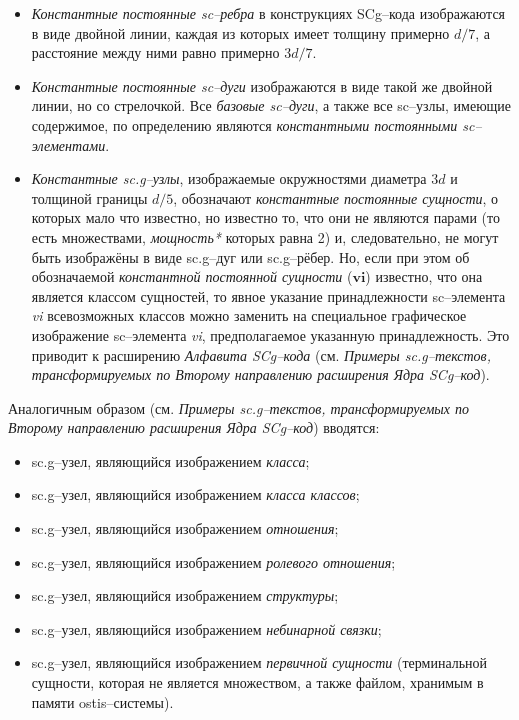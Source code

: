 \begin{itemize}
	\item \textit{Константные постоянные sc--ребра} в конструкциях SCg--кода изображаются в виде двойной линии, каждая из которых имеет толщину примерно $d/7$, а расстояние между ними равно примерно $3d/7$. 
	\item \textit{Константные постоянные sc--дуги} изображаются в виде такой же двойной линии, но со стрелочкой. Все \textit{базовые sc--дуги}, а также все sc--узлы, имеющие содержимое, по определению являются \textit{константными постоянными sc--элементами}. 
	\item \textit{Константные sc.g--узлы}, изображаемые окружностями диаметра $3d$ и толщиной границы $d/5$, обозначают \textit{константные постоянные сущности}, о которых мало что известно, но известно то, что они не являются парами (то есть множествами, \textit{мощность*} которых равна 2) и, следовательно, не могут быть изображёны в виде sc.g--дуг или sc.g--рёбер. Но, если при этом об обозначаемой \textit{константной постоянной сущности} ($\bm{vi}$) известно, что она является классом сущностей, то явное указание принадлежности sc--элемента \textit{vi} всевозможных классов можно заменить на специальное графическое изображение sc--элемента \textit{vi}, предполагаемое указанную принадлежность. Это приводит к расширению  \textit{Алфавита SCg--кода} (см. \textit{Примеры sc.g--текстов, трансформируемых по Второму направлению расширения Ядра SCg--код}).
\end{itemize}


Аналогичным образом (см. \textit{Примеры sc.g--текстов, трансформируемых по Второму направлению расширения Ядра SCg--код}) вводятся: 
\begin{itemize}
	\item sc.g--узел, являющийся изображением \textit{класса};  
	\item sc.g--узел, являющийся изображением \textit{класса классов};  
	\item sc.g--узел, являющийся изображением \textit{отношения}; 
	\item sc.g--узел, являющийся изображением \textit{ролевого отношения}; 
	\item sc.g--узел, являющийся изображением \textit{структуры};  
	\item sc.g--узел, являющийся изображением \textit{небинарной связки};
	\item sc.g--узел, являющийся изображением \textit{первичной сущности} (терминальной сущности, которая не является множеством, а также файлом, хранимым в памяти ostis--системы).
\end{itemize}

